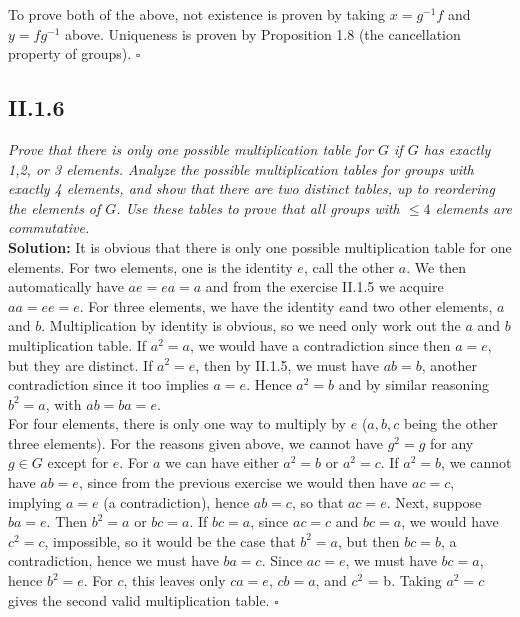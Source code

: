 \documentclass[11pt,a4paper]{article}
\begin{document}
\noindent To prove both of the above, not existence is proven by taking $x = g^{-1}f$ and $y = fg^{-1}$ above.  Uniqueness is proven by Proposition 1.8 (the cancellation property of groups). $\square$

\subsection*{II.1.6} \textit{Prove that there is only one possible multiplication table for $G$ if $G$ has exactly 1,2, or 3 elements.  Analyze the possible multiplication tables for groups with exactly 4 elements, and show that there are two distinct tables, up to reordering the elements of $G$.  Use these tables to prove that all groups with $\leq 4$ elements are commutative.}\\

\noindent \textbf{Solution:} It is obvious that there is only one possible multiplication table for one elements.  For two elements, one is the identity $e$, call the other $a$.  We then automatically have $ae = ea = a$ and from the exercise II.1.5 we acquire $aa = ee = e$.  For three elements, we have the identity $e$and two other elements, $a$ and $b$.  Multiplication by identity is obvious, so we need only work out the $a$ and $b$ multiplication table.  If $a^2 = a$, we would have a contradiction since then $a = e$, but they are distinct. If $a^2 = e$, then by II.1.5, we must have $ab = b$, another contradiction since it too implies $a = e$. Hence $a^2 = b$ and by similar reasoning $b^2 = a$, with $ab = ba = e$. \\

\noindent For four elements, there is only one way to multiply by $e$ ($a,b,c$ being the other three elements). For the reasons given above, we cannot have $g^2 = g$ for any $g \in G$ except for $e$. For $a$ we can have either $a^2 = b$ or $a^2 = c$.  If $a^2 = b$, we cannot have $ab = e$, since from the previous exercise we would then have $ac = c$, implying $a = e$ (a contradiction), hence $ab = c$, so that $ac = e$.  Next, suppose $ba = e$. Then $b^2 = a$ or $bc = a$.  If $bc = a$, since $ac = c$ and $bc = a$, we would have $c^2 = c$, impossible, so it would be the case that $b^2 = a$, but then $bc = b$, a contradiction, hence we must have $ba = c$.  Since $ac = e$, we must have $bc = a$, hence $b^2 = e$.  For $c$, this leaves only $ca = e$, $cb = a$, and $c^2$ = b.  Taking $a^2 = c$ gives the second valid multiplication table. $\square$ \\ 
\end{document}
